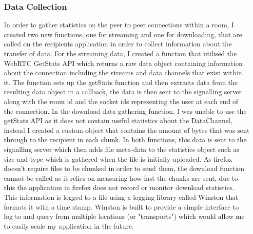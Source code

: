 \documentclass[]{report}
\begin{document}
				\subsubsection{Data Collection}
				In order to gather statistics on the peer to peer connections within a room, I created two new functions, one for streaming and one for downloading, that are called on the recipients application in order to collect information about the transfer of data. For the streaming data, I created a function that utilised the WebRTC GetStats API which returns a raw data object containing information about the connection including the streams and data channels that exist within it. The function sets up the getStats function and then extracts data from the resulting data object in a callback, the data is then sent  to the signalling server along with the room id and the socket ids representing the user at each end of the connection. In the download data gathering function, I was unable to use the getStats API as it does not contain useful statistics about the DataChannel, instead I created a custom object that contains the amount of bytes that was sent through to the recipient in each chunk. In both functions, this data is sent to the signalling server which then adds file meta-data to the statistics object such as size and type which is gathered when the file is initially uploaded. As firefox doesn't require files to be chunked in order to send them, the download function cannot be called as it relies on measuring how fast the chunks are sent, due to this the application in firefox does not record or monitor download statistics. This information is logged to a file using a logging library called Winston that formats it with a time stamp. Winston is built to provide a simple interface to log to and query from multiple locations (or "transports") which would allow me to easily scale my application in the future.
				
\end{document}
